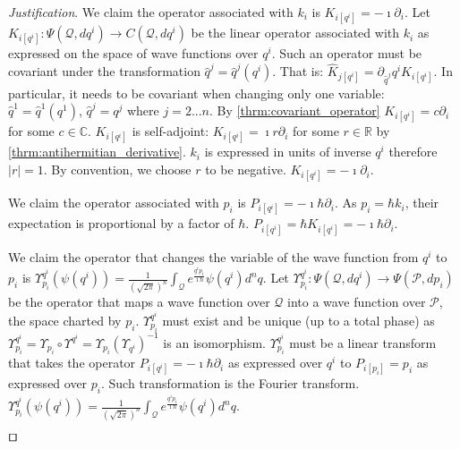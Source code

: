 \documentclass[smallextended]{svjour3}
\numberwithin{equation}{section}
\newenvironment{justification}{\emph{Justification}.}{\hfill\(\qed\)}
\begin{document}
\begin{justification}
	We claim the operator associated with $k_i$ is $K_{i [q^i]} = - \imath \partial_{i}$. Let $K_{i [q^i]} : \Psi(\mathcal{Q}, dq^i) \rightarrow C(\mathcal{Q}, dq^i)$ be the linear operator associated with $k_i$ as expressed on the space of wave functions over $q^i$. Such an operator must be covariant under the transformation $\hat{q}^j = \hat{q}^j(q^i)$. That is: $\hat{K}_{j [q^i]} = \partial_{\hat{q}^j}q^iK_{i [q^i]}$. In particular, it needs to be covariant when changing only one variable: $\hat{q}^1 = \hat{q}^1(q^1)$, $\hat{q}^j = q^j$ where $j=2...n$. By \ref{thrm:covariant_operator} $K_{i [q^i]}=c\partial_i$ for some $c \in \mathbb{C}$. $K_{i [q^i]}$ is self-adjoint: $K_{i  [q^i]}=\imath r\partial_i$ for some $r \in \mathbb{R}$ by \ref{thrm:antihermitian_derivative}. $k_i$ is expressed in units of inverse $q^i$ therefore $|r|=1$. By convention, we choose $r$ to be negative. $K_{i [q^i]} = - \imath \partial_{i}$.
	
	We claim the operator associated with $p_i$ is $P_{i [q^i]} = - \imath \hbar \partial_{i}$. As $p_i=\hbar k_i$, their expectation is proportional by a factor of $\hbar$. $P_{i [q^i]}=\hbar K_{i [q^i]}= -\imath \hbar \partial_i$.
	
	We claim the operator that changes the variable of the wave function from $q^i$ to $p_i$ is $\Upsilon^{q^i}_{p_i} (\psi(q^i)) = \frac{1}{(\sqrt{2\pi})^n} \int_{\mathcal{Q}} e^{\frac{q^i p_i }{\imath \hbar}} \psi(q^i) d^n q $. Let $\Upsilon^{q^i}_{p_i} : \Psi(\mathcal{Q}, dq^i) \rightarrow \Psi(\mathcal{P}, dp_i)$ be the operator that maps a wave function over $\mathcal{Q}$ into a wave function over $\mathcal{P}$, the space charted by $p_i$. $\Upsilon^{q^i}_{p_i}$ must exist and be unique (up to a total phase) as $\Upsilon^{q^i}_{p_i} = \Upsilon_{p_i}\circ\Upsilon^{q^i} = \Upsilon_{p_i}(\Upsilon_{q^i})^{-1}$ is an isomorphism. $\Upsilon^{q^i}_{p_i}$ must be a linear transform that takes the operator $P_{i [q^i]}= - \imath \hbar \partial_i$ as expressed over $q^i$ to $P_{i [p_i]} = p_i$ as expressed over $p_i$. Such transformation is the Fourier transform. $\Upsilon^{q^i}_{p_i} (\psi(q^i)) = \frac{1}{(\sqrt{2\pi})^n} \int_{\mathcal{Q}} e^{\frac{q^i p_i }{\imath \hbar}} \psi(q^i) d^n q $.
	

\end{justification}
\end{document}
